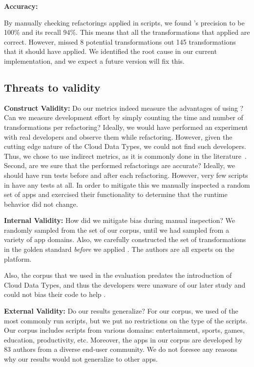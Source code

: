 \documentclass[preprint]{sigplanconf}
\begin{document}
\textbf{Accuracy:}

By manually checking refactorings applied in \numManual scripts, we found \tool's precision to be 100\% and its recall 94\%. This means that all the transformations that \tool applied are correct. However, \tool missed 8 potential transformations out 145 transformations that it should have applied. We identified the root cause in our current implementation, and we expect a future version will fix this. 

\subsection{Threats to validity}
\textbf{Construct Validity:}  Do our metrics indeed measure the advantages of using \tool? Can we measure development effort by simply counting the time and number of transformations per refactoring? Ideally, we would have performed an experiment with real \TD developers and observe them while refactoring. However, given the cutting edge nature of the Cloud Data Types, we could not find such developers. Thus, we chose to use indirect metrics, as it is commonly done in the literature~\cite{Gyori:Lambdaficator,Wloka:Reentrancer}. 
Second, are we sure that the performed refactorings are accurate? Ideally, we should have run tests before and after each refactoring. However, very few scripts in \TD have any tests at all. In order to mitigate this we manually inspected a random set of \numManual apps and exercised their functionality to determine that the runtime behavior did not change.

\textbf{Internal Validity:}  How did we mitigate bias during manual inspection? We randomly sampled from the set of our corpus, until we had sampled from a variety of app domains. Also, we carefully constructed the set of transformations in the golden standard \emph{before} we applied \tool. The authors are all experts on the \TD platform.

Also, the corpus that we used in the evaluation predates the introduction of Cloud Data Types, and thus the developers were unaware of our later study and could not bias their code to help \tool. 

\textbf{External Validity:}  Do our results generalize? For our corpus, we used \numScripts of the most commonly run scripts, but we put no restrictions on the type of the scripts.  Our corpus includes scripts from various domains: entertainment, sports, games, education, productivity, etc. Moreover, the apps in our corpus are developed by 83 authors from a diverse end-user community. We do not foresee any reasons why our results would not generalize to other \TD apps.  
\end{document}
